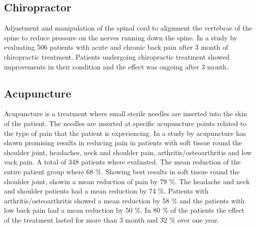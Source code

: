 
\subsection{Chiropractor}
Adjustment and manipulation of the spinal cord to alignment the vertebrae of the spine to reduce pressure on the nerves running down the spine. \cite{Gerald2013}
In a study by \cite{Peterson2012} evaluating 506 patients with acute and chronic back pain after 3 month of chiropractic treatment.
Patients undergoing chiropractic treatment showed improvements in their condition and the effect was ongoing after 3 month. \cite{Peterson2012}

\subsection{Acupuncture}
Acupuncture is a treatment where small sterile needles are inserted into the skin of the patient. The needles are inserted at specific acupuncture points related to the type of pain that the patient is experiencing. \cite{Dhanani2011} 
In a study by \cite{Junnilla1983} acupuncture has shown promising results in reducing pain in patients with soft tissue round the shoulder joint, headaches, neck and shoulder pain, arthritis/osteoarthritis and low vack pain. A total of 348 patients where evaluated. The mean reduction of the entire patient group where 68 \%. Showing best results in soft tissue round the shoulder joint, showin a mean reduction of pain by 79 \%. The headache and neck and shoulder patients had a mean reduction by 74 \%. Patients with  arthritis/osteoarthritis showed a mean reduction by 58 \% and the patients with low back pain had a mean reduction by 50 \%. In 80 \% of the patients the effect of the treatment lasted for more than 3 month and 32 \% over one year. \cite{Junnilla1983}

